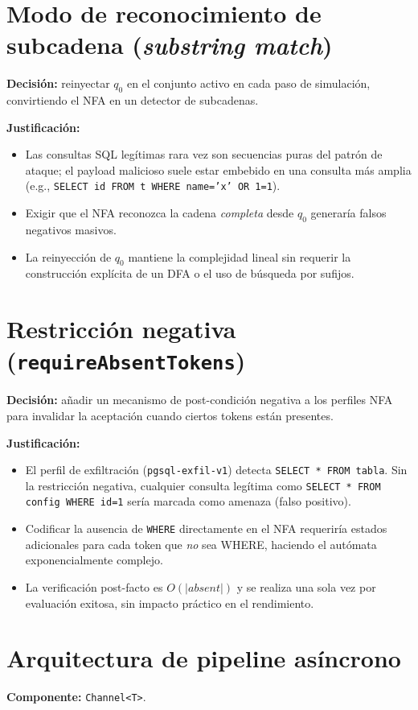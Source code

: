 \documentclass[12pt, a4paper]{report}
\theoremstyle{definition}
\theoremstyle{remark}
\newcommand{\tok}[1]{\texttt{\color{codeblue}#1}}
\begin{document}
\section{Modo de reconocimiento de subcadena (\emph{substring match})}

\textbf{Decisión:} reinyectar $q_0$ en el conjunto activo en cada paso de
simulación, convirtiendo el NFA en un detector de subcadenas.

\textbf{Justificación:}
\begin{itemize}
  \item Las consultas SQL legítimas rara vez son secuencias puras del patrón
    de ataque; el payload malicioso suele estar embebido en una consulta
    más amplia (e.g., \texttt{SELECT id FROM t WHERE name='x' OR 1=1}).
  \item Exigir que el NFA reconozca la cadena \emph{completa} desde $q_0$
    generaría falsos negativos masivos.
  \item La reinyección de $q_0$ mantiene la complejidad lineal sin requerir
    la construcción explícita de un DFA o el uso de búsqueda por sufijos.
\end{itemize}

\section{Restricción negativa (\texttt{requireAbsentTokens})}

\textbf{Decisión:} añadir un mecanismo de post-condición negativa a los
perfiles NFA para invalidar la aceptación cuando ciertos tokens están presentes.

\textbf{Justificación:}
\begin{itemize}
  \item El perfil de exfiltración (\texttt{pgsql-exfil-v1}) detecta
    \texttt{SELECT * FROM tabla}. Sin la restricción negativa, cualquier consulta
    legítima como \texttt{SELECT * FROM config WHERE id=1} sería marcada como
    amenaza (falso positivo).
  \item Codificar la ausencia de \tok{WHERE} directamente en el NFA requeriría
    estados adicionales para cada token que \emph{no} sea WHERE, haciendo
    el autómata exponencialmente complejo.
  \item La verificación post-facto es $O(|\mathit{absent}|)$ y se realiza
    una sola vez por evaluación exitosa, sin impacto práctico en el rendimiento.
\end{itemize}

\section{Arquitectura de pipeline asíncrono}
\noindent\textbf{Componente:} \texttt{Channel\textless T\textgreater}.
\end{document}
